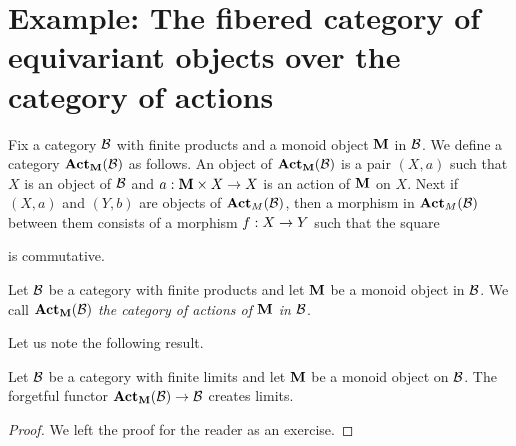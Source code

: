 \section{Example: The fibered category of equivariant objects over the category of actions}\label{section:fibered_category_over_the_category_of_actions}
\noindent
Fix a category ${\mathcal B}$ with finite products and a monoid object $\mathbf{M}$ in ${\mathcal B}$. We define a category $\mathbf{Act}_{\mathbf{M}}({\mathcal B})$ as follows. An object of $\mathbf{Act}_{\mathbf{M}}({\mathcal B})$ is a pair $(X,a)$ such that $X$ is an object of ${\mathcal B}$ and $a:\mathbf{M}\times X \rightarrow X$ is an action of $\mathbf{M}$ on $X$. Next if $(X,a)$ and $(Y,b)$ are objects of $\mathbf{Act}_{M}({\mathcal B})$, then a morphism in $\mathbf{Act}_{M}({\mathcal B})$ between them consists of a morphism $f:X\rightarrow Y$ such that the square
\begin{center}
\end{center}
is commutative.

\begin{definition}
Let ${\mathcal B}$ be a category with finite products and let $\mathbf{M}$ be a monoid object in ${\mathcal B}$. We call $\mathbf{Act}_{\mathbf{M}}({\mathcal B})$ \textit{the category of actions of $\mathbf{M}$ in ${\mathcal B}$}.
\end{definition}
\noindent
Let us note the following result.

\begin{proposition}\label{proposition:creation_of_limits_for_actions_of_monoids}
Let ${\mathcal B}$ be a category with finite limits and let $\mathbf{M}$ be a monoid object on ${\mathcal B}$. The forgetful functor $\mathbf{Act}_{\mathbf{M}}({\mathcal B})\rightarrow {\mathcal B}$ creates limits.
\end{proposition}
\begin{proof}
We left the proof for the reader as an exercise.
\end{proof}

